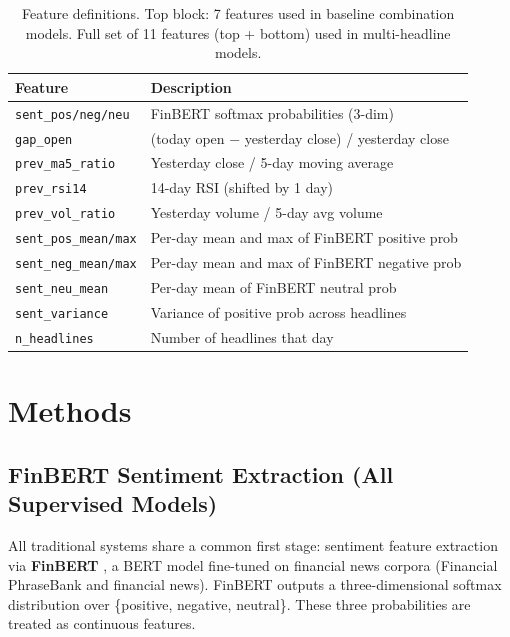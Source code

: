 \documentclass[11pt]{article}
\begin{document}
\begin{table}[t]
\centering
\small
\begin{tabular}{lp{4.5cm}}
\toprule
\textbf{Feature} & \textbf{Description} \\
\midrule
\texttt{sent\_pos/neg/neu} & FinBERT softmax probabilities (3-dim) \\
\texttt{gap\_open} & (today open $-$ yesterday close) / yesterday close \\
\texttt{prev\_ma5\_ratio} & Yesterday close / 5-day moving average \\
\texttt{prev\_rsi14} & 14-day RSI (shifted by 1 day) \\
\texttt{prev\_vol\_ratio} & Yesterday volume / 5-day avg volume \\
\midrule
\texttt{sent\_pos\_mean/max} & Per-day mean and max of FinBERT positive prob \\
\texttt{sent\_neg\_mean/max} & Per-day mean and max of FinBERT negative prob \\
\texttt{sent\_neu\_mean} & Per-day mean of FinBERT neutral prob \\
\texttt{sent\_variance} & Variance of positive prob across headlines \\
\texttt{n\_headlines} & Number of headlines that day \\
\bottomrule
\end{tabular}
\caption{Feature definitions. Top block: 7 features used in baseline combination models. Full set of 11 features (top + bottom) used in multi-headline models.}
\label{tab:features}
\end{table}

\section{Methods}
\label{sec:methods}

\subsection{FinBERT Sentiment Extraction (All Supervised Models)}

All traditional systems share a common first stage: sentiment feature extraction via \textbf{FinBERT} \citep{araci2019finbert}, a BERT \citep{devlin2019bert} model fine-tuned on financial news corpora (Financial PhraseBank \citep{malo2014gooddebt} and financial news). FinBERT outputs a three-dimensional softmax distribution over \{positive, negative, neutral\}. These three probabilities are treated as continuous features.
\end{document}
